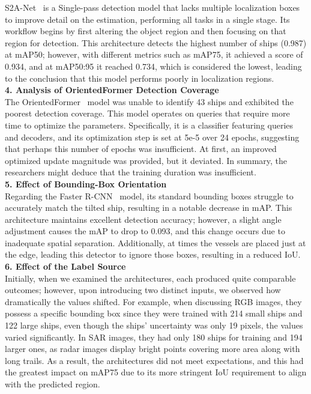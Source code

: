 S2A-Net~\cite{han2021align} is a Single-pass detection model that lacks multiple localization boxes to improve detail on the estimation, performing all tasks in a single stage. Its workflow begins by first altering the object region and then focusing on that region for detection. This architecture detects the highest number of ships (0.987) at mAP50; however, with different metrics such as mAP75, it achieved a score of 0.934, and at mAP50:95 it reached 0.734, which is considered the lowest, leading to the conclusion that this model performs poorly in localization regions.\\

\noindent\textbf{4. Analysis of OrientedFormer Detection Coverage}\\
The OrientedFormer~\cite{zhao2024orientedformer} model was unable to identify 43 ships and exhibited the poorest detection coverage. This model operates on queries that require more time to optimize the parameters. Specifically, it is a classifier featuring queries and decoders, and its optimization step is set at 5e-5 over 24 epochs, suggesting that perhaps this number of epochs was insufficient. At first, an improved optimized update magnitude was provided, but it deviated. In summary, the researchers might deduce that the training duration was insufficient.\\

\noindent\textbf{5. Effect of Bounding-Box Orientation}\\
Regarding the Faster R-CNN~\cite{7485869} model, its standard bounding boxes struggle to accurately match the tilted ship, resulting in a notable decrease in mAP. This architecture maintains excellent detection accuracy; however, a slight angle adjustment causes the mAP to drop to 0.093, and this change occurs due to inadequate spatial separation. Additionally, at times the vessels are placed just at the edge, leading this detector to ignore those boxes, resulting in a reduced IoU.\\

\noindent\textbf{6. Effect of the Label Source}\\
Initially, when we examined the architectures, each produced quite comparable outcomes; however, upon introducing two distinct inputs, we observed how dramatically the values shifted. For example, when discussing RGB images, they possess a specific bounding box since they were trained with 214 small ships and 122 large ships, even though the ships' uncertainty was only 19 pixels, the values varied significantly. In SAR images, they had only 180 ships for training and 194 larger ones, as radar images display bright points covering more area along with long trails. As a result, the architectures did not meet expectations, and this had the greatest impact on mAP75 due to its more stringent IoU requirement to align with the predicted region.\\

